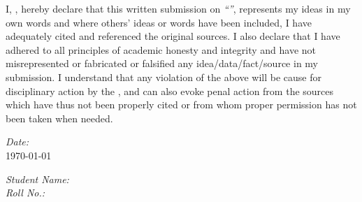 
\begin{declaration}
    \addchaptertocentry{\authorshipname} %
    
    \noindent I, \authorname, hereby declare that this written submission on \textit{\enquote{\ttitle}}, represents my ideas in my own words and where others' ideas or words have been included, I have adequately cited and referenced the original sources. I also declare that I have adhered to all principles of academic honesty and integrity and have not misrepresented or fabricated or falsified any idea/data/fact/source in my submission. I understand that any violation of the above will be cause for disciplinary action by the \emph{\univname}, and can also evoke penal action from the sources which have thus not been properly cited or from whom proper permission has not been taken when needed.


    \vspace{0.2\textwidth}
    \noindent \begin{minipage}[t]{0.5\textwidth}
        \begin{flushleft}
            \large
            \emph{Date:}\\ \vspace{0.03\textwidth}
            \today
        \end{flushleft}
    \end{minipage}
    \begin{minipage}[t]{0.5\textwidth}
        \begin{flushright}
            \large
            \emph{Student Name:} \authorname\\ \vspace{0.03\textwidth}
            \emph{Roll No.:} \matnumber
        \end{flushright}
    \end{minipage}
\end{declaration}
